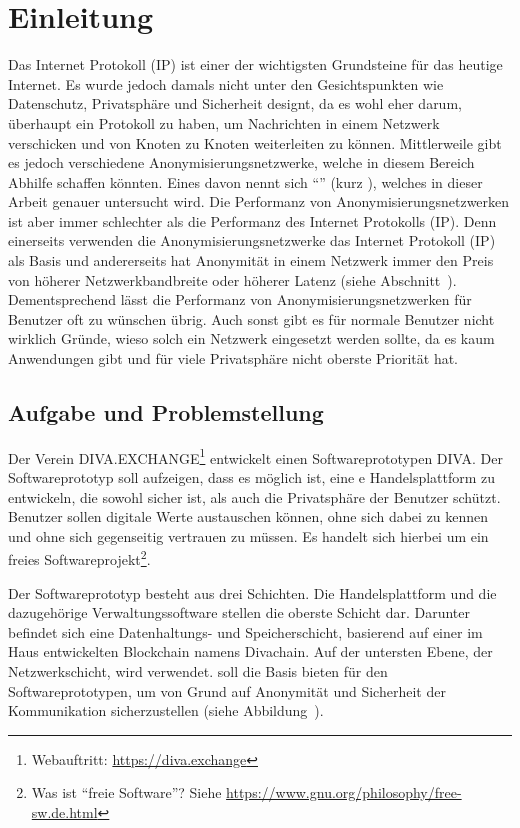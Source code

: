 \chapter{Einleitung}
\label{ch:Einleitung}

Das Internet Protokoll (IP) ist einer der wichtigsten Grundsteine für das heutige Internet.
Es wurde jedoch damals nicht unter den Gesichtspunkten wie Datenschutz, Privatsphäre und Sicherheit designt,
da es wohl eher darum, überhaupt ein Protokoll zu haben, um Nachrichten in einem Netzwerk verschicken und von Knoten zu Knoten weiterleiten zu können.
Mittlerweile gibt es jedoch verschiedene Anonymisierungsnetzwerke, welche in diesem Bereich Abhilfe schaffen könnten.
Eines davon nennt sich ``'' (kurz ), welches in dieser Arbeit genauer untersucht wird.
Die Performanz von Anonymisierungsnetzwerken ist aber immer schlechter als die Performanz des Internet Protokolls (IP).
Denn einerseits verwenden die Anonymisierungsnetzwerke das Internet Protokoll (IP) als Basis und andererseits hat Anonymität in einem Netzwerk immer den Preis von höherer Netzwerkbandbreite oder höherer Latenz (siehe Abschnitt~).
Dementsprechend lässt die Performanz von Anonymisierungsnetzwerken für Benutzer oft zu wünschen übrig.
Auch sonst gibt es für normale Benutzer nicht wirklich Gründe, wieso solch ein Netzwerk eingesetzt werden sollte,
da es kaum Anwendungen gibt und für viele Privatsphäre nicht oberste Priorität hat.

\section{Aufgabe und Problemstellung}\label{sec:aufgabe}

Der Verein DIVA.EXCHANGE\footnote{Webauftritt: \url{https://diva.exchange}} entwickelt einen Softwareprototypen DIVA.
Der Softwareprototyp soll aufzeigen, dass es möglich ist, eine e Handelsplattform zu entwickeln,
die sowohl sicher ist, als auch die Privatsphäre der Benutzer schützt.
Benutzer sollen digitale Werte austauschen können, ohne sich dabei zu kennen und ohne sich gegenseitig vertrauen zu müssen.
Es handelt sich hierbei um ein freies Softwareprojekt\footnote{Was ist ``freie Software''? Siehe \url{https://www.gnu.org/philosophy/free-sw.de.html}}.

Der Softwareprototyp besteht aus drei Schichten.
Die Handelsplattform und die dazugehörige Verwaltungssoftware stellen die oberste Schicht dar.
Darunter befindet sich eine Datenhaltungs- und Speicherschicht, basierend auf einer im Haus entwickelten Blockchain namens Divachain.
Auf der untersten Ebene, der Netzwerkschicht, wird  verwendet.
 soll die Basis bieten für den Softwareprototypen, um von Grund auf Anonymität und Sicherheit der Kommunikation sicherzustellen (siehe Abbildung~).


